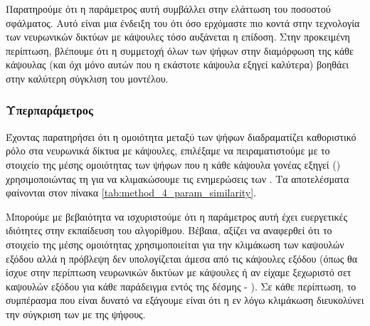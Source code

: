 Παρατηρούμε ότι η παράμετρος αυτή συμβάλλει στην ελάττωση του ποσοστού σφάλματος. Αυτό είναι μια ένδειξη του ότι όσο ερχόμαστε πιο κοντά στην τεχνολογία των νευρωνικών δικτύων με κάψουλες τόσο αυξάνεται η επίδοση. Στην προκειμένη περίπτωση, βλέπουμε ότι η συμμετοχή όλων των ψήφων στην διαμόρφωση της κάθε κάψουλας (και όχι μόνο αυτών που η εκάστοτε κάψουλα εξηγεί καλύτερα) βοηθάει στην καλύτερη σύγκλιση του μοντέλου.

\subsubsection{Υπερπαράμετρος }
Έχοντας παρατηρήσει ότι η ομοιότητα μεταξύ των ψήφων διαδραματίζει καθοριστικό ρόλο στα νευρωνικά δίκτυα με κάψουλες, επιλέξαμε να πειραματιστούμε με το στοιχείο της μέσης ομοιότητας των ψήφων που η κάθε κάψουλα γονέας εξηγεί () χρησιμοποιώντας τη για να κλιμακώσουμε τις ενημερώσεις των . Τα αποτελέσματα φαίνονται στον πίνακα \ref{tab:method_4_param_similarity}.\par


\begin{table}[h]
    \begin{center}
    \end{center}
    \caption[]{\label{tab:method_4_param_similarity}Επίδραση της παραμέτρου  της μεθόδου 4 στην επίδοση (όπως μετράται από το ποσοστό σφάλματος) στο σύνολο δεδομένων ελέγχου . Τα πειράματα αυτά πραγματοποιήθηκαν για 10 εποχές με μέγεθος δέσμης ίσο με 8.} 
\end{table}

Μπορούμε με βεβαιότητα να ισχυριστούμε ότι η παράμετρος αυτή έχει ευεργετικές ιδιότητες στην εκπαίδευση του αλγορίθμου. Βέβαια, αξίζει να αναφερθεί ότι το στοιχείο της μέσης ομοιότητας χρησιμοποιείται για την κλιμάκωση των καψουλών εξόδου αλλά η πρόβλεψη δεν υπολογίζεται άμεσα από τις κάψουλες εξόδου (όπως θα ίσχυε στην περίπτωση νευρωνικών δικτύων με κάψουλες ή αν είχαμε ξεχωριστό σετ καψουλών εξόδου για κάθε παράδειγμα εντός της δέσμης - ). Σε κάθε περίπτωση, το συμπέρασμα που είναι δυνατό να εξάγουμε είναι ότι η εν λόγω κλιμάκωση διευκολύνει την σύγκριση των  με της ψήφους.

